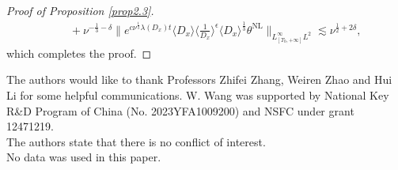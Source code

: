 \documentclass[reqno, 12pt]{amsart} %
\theoremstyle{plain} %
\theoremstyle{definition}
\theoremstyle{remark}
\numberwithin{equation}{section} %
\begin{document}
\begin{proof}[Proof of Proposition \ref{prop2.3}]
\begin{equation*}
\begin{aligned}
				&\quad + \nu^{-\frac{1}{3} - \delta} \| e^{c \nu^{\frac{1}{3}} \lambda(D_x) t} \langle D_x \rangle \langle \tfrac{1}{D_x} \rangle^\epsilon \langle D_x \rangle^{\frac{1}{3}} \theta^{\mathrm{NL}} \|_{L^\infty_{[T_0, +\infty]} L^2} 
				\lesssim \nu^{\frac{1}{2} + 2\delta},
			\end{aligned}
		\end{equation*}
		which completes the proof.
	\end{proof}


	The authors would like to thank Professors Zhifei Zhang, Weiren Zhao and Hui Li for some helpful communications. W. Wang was supported by National Key R\&D Program of China (No. 2023YFA1009200) and NSFC under grant 12471219.\\
	The authors state that there is no conflict of interest.\\
	
	No data was used in this paper.
\end{document}
